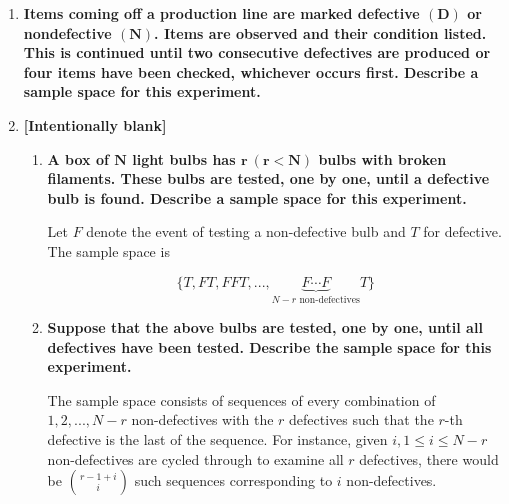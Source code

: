 \documentclass[10pt, oneside]{article}   	%
\theoremstyle{definition}
\begin{document}
\begin{enumerate}[label=1.\arabic*]
\begin{enumerate}
	
	\end{enumerate}

\item  \begin{tcolorbox}[
  colback=Cerulean!5!white,
  colframe=Cerulean!75!black]
\textbf{Items coming off a production line are marked defective $\bm{(D)}$ or nondefective $\bm{(N)}$. Items are observed and their condition listed. This is continued until two consecutive defectives are produced or four items have been checked, whichever occurs first. Describe a sample space for this experiment.}
\end{tcolorbox}


\item  \begin{tcolorbox}[
  colback=Cerulean!5!white,
  colframe=Cerulean!75!black]
\textbf{[Intentionally blank]}
\end{tcolorbox}

	\begin{enumerate}
	\item  \begin{tcolorbox}[
	  colback=Cerulean!5!white,
	  colframe=Cerulean!75!black]
	\textbf{A box of $\bm{N}$ light bulbs has $\bm{r \ (r < N)}$ bulbs with broken filaments. These bulbs are tested, one by one, until a defective bulb is found. Describe a sample space for this experiment.}
	\end{tcolorbox}
	
	Let $F$ denote the event of testing a non-defective bulb and $T$ for defective. The sample space is
	
	\[ \boxed{ \{ T, FT, FFT, ..., \underbrace{F\cdots F}_{N-r \text{ non-defectives}}T \} } \]
	
	\item  \begin{tcolorbox}[
	  colback=Cerulean!5!white,
	  colframe=Cerulean!75!black]
	\textbf{Suppose that the above bulbs are tested, one by one, until all defectives have been tested. Describe the sample space for this experiment.}
	\end{tcolorbox}
	
	The sample space consists of sequences of every combination of $1, 2, ..., N-r$ non-defectives with the $r$ defectives such that the $r$-th defective is the last of the sequence. For instance, given $i, 1 \leq i \leq N-r$ non-defectives are cycled through to examine all $r$ defectives, there would be $\binom{r-1+i}{i}$ such sequences corresponding to $i$ non-defectives.
	

\end{enumerate}
\end{enumerate}
\end{document}
